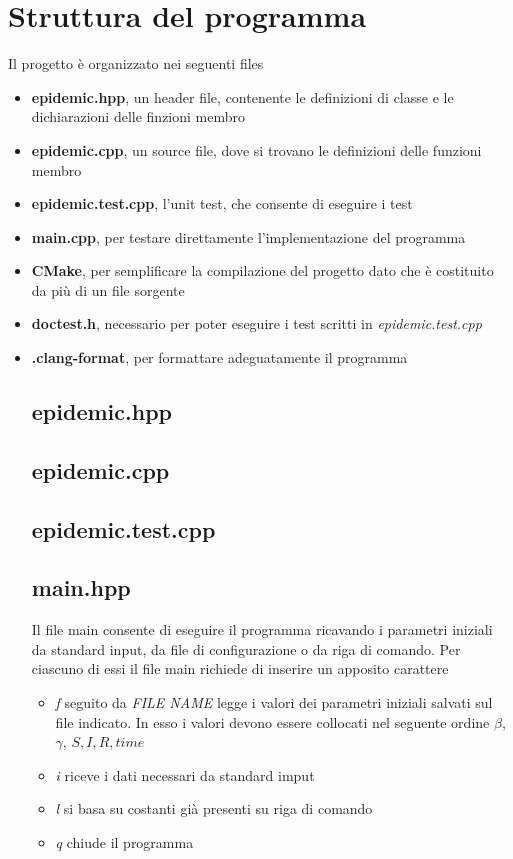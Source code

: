 \documentclass[11pt, a4paper]{article} %
\begin{document}
\section{Struttura del programma}
Il progetto \`{e} organizzato nei seguenti files 
\begin{itemize}
    \item \textbf{epidemic.hpp}, un header file, contenente le definizioni di classe 
    e le dichiarazioni delle finzioni membro 
    \item \textbf{epidemic.cpp}, un source file, dove si trovano le definizioni delle
    funzioni membro
    \item \textbf{epidemic.test.cpp}, l'unit test, che consente di eseguire i test
    \item \textbf{main.cpp}, per testare direttamente l'implementazione del programma
    \item \textbf{CMake}, per semplificare la compilazione del progetto dato che è 
    costituito da pi\`{u} di un file sorgente
    \item \textbf{doctest.h}, necessario per poter eseguire i test scritti in 
    \textit{epidemic.test.cpp}
    \item \textbf{.clang-format}, per formattare adeguatamente il programma

    \subsection{epidemic.hpp}

    \subsection{epidemic.cpp}
    \subsection{epidemic.test.cpp}
    \subsection{main.hpp}
        Il file main consente di eseguire il programma ricavando i parametri iniziali da standard input, da file di 
        configurazione o da riga di comando. Per ciascuno di essi il file main richiede di inserire un apposito carattere
        \begin{itemize}
        \item \textit{f} seguito da \textit{FILE NAME} legge i valori dei parametri iniziali salvati sul file indicato.
        In esso i valori devono essere collocati nel seguente ordine $\beta$, $\gamma$, $S, I, R, time$
        \item \textit{i} riceve i dati necessari da standard imput
        \item \textit{l} si basa su costanti gi\`{a} presenti su riga di comando
        \item \textit{q} chiude il programma
    

\end{itemize}
\end{itemize}
\end{document}
